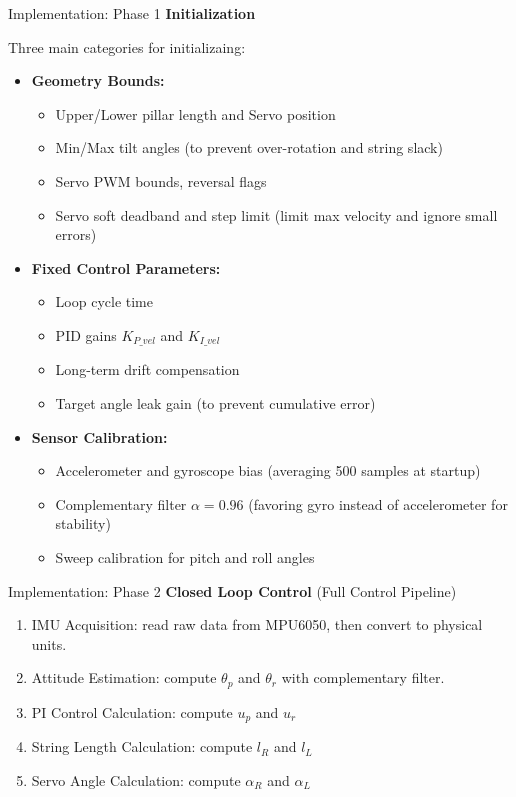 \documentclass[10pt]{beamer}
\begin{document}
\begin{frame}{Implementation: Phase 1}
  \textbf{Initialization}

  Three main categories for initializaing:

  \begin{itemize}
    \item \textbf{Geometry Bounds:}
      \begin{itemize}
        \item Upper/Lower pillar length and Servo position
        \item Min/Max tilt angles (to prevent over-rotation and string slack)
        \item Servo PWM bounds, reversal flags
        \item Servo soft deadband and step limit (limit max velocity and ignore small errors)
      \end{itemize}
    \item \textbf{Fixed Control Parameters:}
      \begin{itemize}
        \item Loop cycle time
        \item PID gains $K_{P\_vel}$ and $K_{I\_vel}$
        \item Long-term drift compensation
        \item Target angle leak gain (to prevent cumulative error)
      \end{itemize}
    \item \textbf{Sensor Calibration:}
      \begin{itemize}
        \item Accelerometer and gyroscope bias (averaging 500 samples at startup)
        \item Complementary filter $\alpha = 0.96$ (favoring gyro instead of accelerometer for stability)
        \item Sweep calibration for pitch and roll angles
      \end{itemize}
  \end{itemize}
\end{frame}

\begin{frame}{Implementation: Phase 2}
  \textbf{Closed Loop Control} (Full Control Pipeline)
  \begin{enumerate}
    \item IMU Acquisition: read raw data from MPU6050, then convert to physical units.
    \item Attitude Estimation: compute $\theta_p$ and $\theta_r$ with complementary filter.
    \item PI Control Calculation: compute $u_p$ and $u_r$
    \item String Length Calculation: compute $l_R$ and $l_L$
    \item Servo Angle Calculation: compute $\alpha_R$ and $\alpha_L$
  \end{enumerate}
\end{frame}
\end{document}
